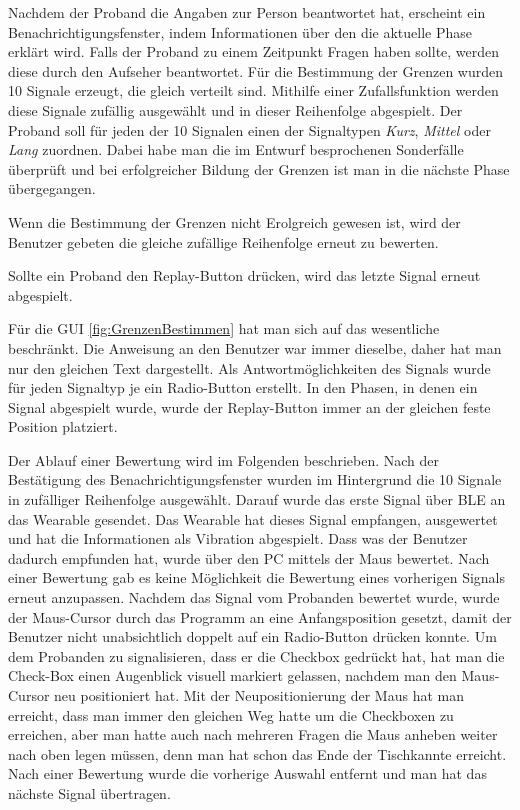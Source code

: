 Nachdem der Proband die Angaben zur Person beantwortet hat, erscheint ein Benachrichtigungsfenster, indem Informationen {\"u}ber den die aktuelle Phase erkl{\"a}rt wird. 
Falls der Proband zu einem Zeitpunkt Fragen haben sollte, werden diese durch den Aufseher beantwortet.
F{\"u}r die Bestimmung der Grenzen wurden 10 Signale erzeugt, die gleich verteilt sind. 
Mithilfe einer Zufallsfunktion werden diese Signale zuf{\"a}llig ausgew{\"a}hlt und in dieser Reihenfolge abgespielt. 
Der Proband soll f{\"u}r jeden der 10 Signalen einen der Signaltypen \textit{Kurz}, \textit{Mittel} oder \textit{Lang} zuordnen. 
Dabei habe man die im Entwurf besprochenen Sonderf{\"a}lle {\"u}berpr{\"u}ft und bei erfolgreicher Bildung der Grenzen ist man in die n{\"a}chste Phase {\"u}bergegangen.

Wenn die Bestimmung der Grenzen nicht Erolgreich gewesen ist, wird der Benutzer gebeten die gleiche zuf{\"a}llige Reihenfolge erneut zu bewerten. 

Sollte ein Proband den Replay-Button dr{\"u}cken, wird das letzte Signal erneut abgespielt.

F{\"u}r die GUI \autoref{fig:GrenzenBestimmen} hat man sich auf das wesentliche beschr{\"a}nkt. Die Anweisung an den Benutzer war immer dieselbe, daher hat man nur den gleichen Text dargestellt. Als Antwortm{\"o}glichkeiten des Signals wurde f{\"u}r jeden Signaltyp je ein Radio-Button erstellt. 
In den Phasen, in denen ein Signal abgespielt wurde, wurde der Replay-Button immer an der gleichen feste Position platziert. 

Der Ablauf einer Bewertung wird im Folgenden beschrieben. 
Nach der Best{\"a}tigung des Benachrichtigungsfenster wurden im Hintergrund die 10 Signale in zuf{\"a}lliger Reihenfolge ausgew{\"a}hlt. Darauf wurde das erste Signal {\"u}ber BLE an das Wearable gesendet. 
Das Wearable hat dieses Signal empfangen, ausgewertet und hat die Informationen als Vibration abgespielt. 
Dass was der Benutzer dadurch empfunden hat, wurde {\"u}ber den PC mittels der Maus bewertet. 
Nach einer Bewertung gab es keine M{\"o}glichkeit die Bewertung eines vorherigen Signals erneut anzupassen. 
Nachdem das Signal vom Probanden bewertet wurde, wurde der Maus-Cursor durch das Programm an eine Anfangsposition gesetzt, damit der Benutzer nicht unabsichtlich doppelt auf ein Radio-Button dr{\"u}cken konnte. 
Um dem Probanden zu signalisieren, dass er die Checkbox gedr{\"u}ckt hat, hat man die Check-Box einen Augenblick visuell markiert gelassen, nachdem man den Maus-Cursor neu positioniert hat. 
Mit der Neupositionierung der Maus hat man erreicht, dass man immer den gleichen Weg hatte um die Checkboxen zu erreichen, aber man hatte auch nach mehreren Fragen die Maus anheben weiter nach oben legen m{\"u}ssen, denn man hat schon das Ende der Tischkannte erreicht. 
Nach einer Bewertung wurde die vorherige Auswahl entfernt und man hat das n{\"a}chste Signal {\"u}bertragen.

